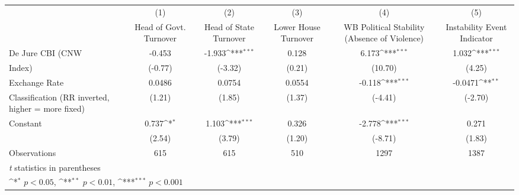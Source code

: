 {
\def\sym#1{\ifmmode^{#1}\else\(^{#1}\)\fi}
\begin{tabular}{l*{5}{c}}
\hline\hline
                    &\multicolumn{1}{c}{(1)}&\multicolumn{1}{c}{(2)}&\multicolumn{1}{c}{(3)}&\multicolumn{1}{c}{(4)}&\multicolumn{1}{c}{(5)}\\
                    &\multicolumn{1}{c}{Head of Govt. Turnover}&\multicolumn{1}{c}{Head of State Turnover}&\multicolumn{1}{c}{Lower House Turnover}&\multicolumn{1}{c}{WB Political Stability (Absence of Violence)}&\multicolumn{1}{c}{Instability Event Indicator}\\
\hline
De Jure CBI (CNW    &      -0.453         &      -1.933\sym{***}&       0.128         &       6.173\sym{***}&       1.032\sym{***}\\
Index)              &     (-0.77)         &     (-3.32)         &      (0.21)         &     (10.70)         &      (4.25)         \\
[1em]
Exchange Rate       &      0.0486         &      0.0754         &      0.0554         &      -0.118\sym{***}&     -0.0471\sym{**} \\
Classification (RR inverted, higher = more fixed)&      (1.21)         &      (1.85)         &      (1.37)         &     (-4.41)         &     (-2.70)         \\
[1em]
Constant            &       0.737\sym{*}  &       1.103\sym{***}&       0.326         &      -2.778\sym{***}&       0.271         \\
                    &      (2.54)         &      (3.79)         &      (1.20)         &     (-8.71)         &      (1.83)         \\
\hline
Observations        &         615         &         615         &         510         &        1297         &        1387         \\
\hline\hline
\multicolumn{6}{l}{\footnotesize \textit{t} statistics in parentheses}\\
\multicolumn{6}{l}{\footnotesize \sym{*} \(p<0.05\), \sym{**} \(p<0.01\), \sym{***} \(p<0.001\)}\\
\end{tabular}
}
